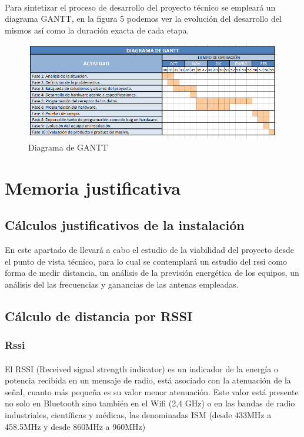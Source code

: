 \documentclass[a4paper ,12pt, onecolumn]{article}
\begin{document}
        \paragraph{}
        Para sintetizar el proceso de desarrollo del proyecto técnico se empleará un diagrama GANTT, en la
        figura 5 podemos ver la evolución del desarrollo del mismos así como la duración exacta de cada etapa. 
        \begin{center}
            \begin{figure}[ht]
                \centering
                \includegraphics[width=1\textwidth]{diagrama de gantt.PNG}
                \caption{Diagrama de GANTT}
                \label{fig:mesh18}
            \end{figure}
        \end{center} 
\section{Memoria justificativa}
    \subsection{Cálculos justificativos de la instalación}
        En este apartado de llevará a cabo el estudio de la viabilidad del proyecto desde el punto de vista
        técnico, para lo cual se contemplará un estudio del rssi como forma de medir distancia, un análisis 
        de la previsión energética de los equipos, un análisis del las frecuencias y ganancias de las antenas 
        empleadas.
    \subsection{Cálculo de distancia por RSSI}
        \subsubsection{Rssi}
            \paragraph{}
            El RSSI (Received signal strength indicator) es un indicador de la energía o potencia recibida en un mensaje de radio, 
            está asociado con la atenuación de la señal, cuanto más pequeña es su valor menor atenuación. Este valor está 
            presente no solo en Bluetooth sino también en el Wifi (2,4 GHz) o en las bandas de radio industriales, científicas y médicas,
            las denominadas ISM (desde 433MHz a 458.5MHz y desde 860MHz a 960MHz)
\end{document}
